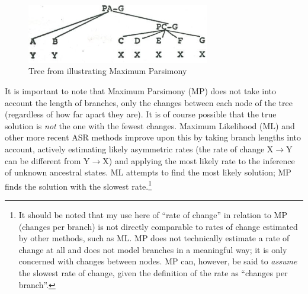 \documentclass[12pt,letterpaper]{article}
\begin{document}
\begin{figure}[ht]
\centering
\includegraphics[width=8cm]{illustrations/Clark_1977_tree.png}
\caption{{Tree from \citet[19]{clark1973aspects} illustrating Maximum Parsimony}}
\label{fig:clark_tree}
\end{figure}

It is important to note that Maximum Parsimony (MP) does not take into account the length of branches, only the changes between each node of the tree (regardless of how far apart they are). It is of course possible that the true solution is \textit{not} the one with the fewest changes. Maximum Likelihood (ML) and other more recent ASR methods improve upon this by taking branch lengths into account, actively estimating likely asymmetric rates (the rate of change X$\rightarrow$Y can be different from Y$\rightarrow$X) and applying the most likely rate to the inference of unknown ancestral states. ML attempts to find the most likely solution; MP finds the solution with the slowest rate.\footnote{It should be noted that my use here of ``rate of change'' in relation to MP (changes per branch) is not directly comparable to rates of change estimated by other methods, such as ML. MP does not technically estimate a rate of change at all and does not model branches in a meaningful way; it is only concerned with changes between nodes. MP can, however, be said to \textit{assume} the slowest rate of change, given the definition of the rate as ``changes per branch''.}
\end{document}
